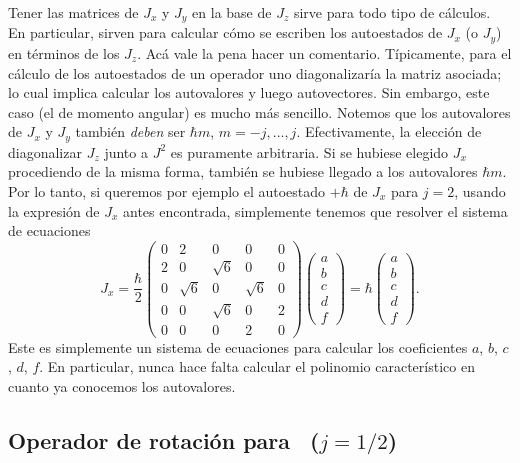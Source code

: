 \documentclass[10pt, a4paper]{article}
\numberwithin{equation}{subsection}
\begin{document}
Tener las matrices de $J_x$ y $J_y$ en la base de $J_z$ sirve para todo tipo de
cálculos. En particular, sirven para calcular cómo se escriben los autoestados
de $J_x$ (o $J_y$) en términos de los $J_z$. Acá vale la pena hacer un
comentario. Típicamente, para el cálculo de los autoestados de un operador uno
diagonalizaría la matriz asociada; lo cual implica calcular los autovalores y
luego autovectores. Sin embargo, este caso (el de momento angular) es mucho más
sencillo. Notemos que los autovalores de $J_x$ y $J_y$ también \emph{deben} ser
$\hbar m$, $m = -j, \dots, j$. Efectivamente, la elección de diagonalizar $J_z$
junto a $J^2$ es puramente arbitraria. Si se hubiese elegido $J_x$ procediendo
de la misma forma, también se hubiese llegado a los autovalores $\hbar m$. Por
lo tanto, si queremos por ejemplo el autoestado $+\hbar$ de $J_x$ para $j = 2$,
usando la expresión de $J_x$ antes encontrada, simplemente tenemos que resolver
el sistema de ecuaciones
\begin{equation}
  J_x = \frac{\hbar}{2}
  \begin{pmatrix}
    0 & 2 & 0 & 0 & 0 \\
    2 & 0 & \sqrt{6} & 0 & 0 \\
    0 & \sqrt{6} & 0 & \sqrt{6} & 0 \\
    0 & 0 & \sqrt{6} & 0 & 2 \\
    0 & 0 & 0 & 2 & 0
  \end{pmatrix}
  \begin{pmatrix} a \\ b \\ c \\ d \\ f \end{pmatrix} = 
  \hbar\begin{pmatrix} a \\ b \\ c \\ d \\ f \end{pmatrix}.
\end{equation}
Este es simplemente un sistema de ecuaciones para calcular los coeficientes
$a$, $b$, $c$, $d$, $f$. En particular, nunca hace falta calcular el polinomio
característico en cuanto ya conocemos los autovalores.

\subsection{Operador de rotación para \spinhalf~($j = 1/2$)}
  \label{sec:oprotspinhalf}
\end{document}
